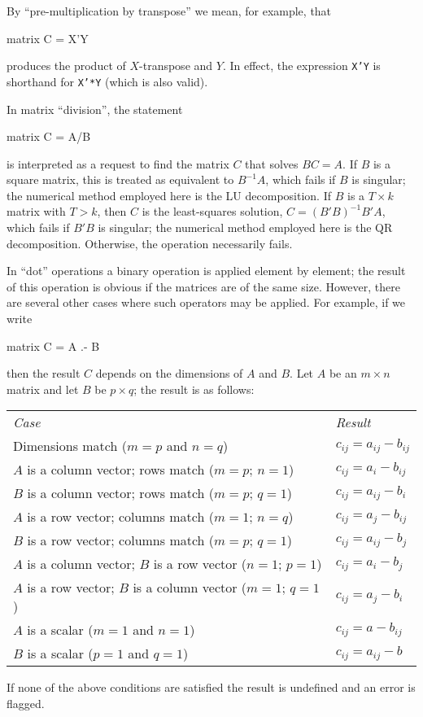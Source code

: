 By ``pre-multiplication by transpose'' we mean, for example, that 
%
\begin{code}
matrix C = X'Y
\end{code}
%
produces the product of $X$-transpose and $Y$.  In effect, 
the expression \texttt{X'Y} is shorthand for \texttt{X'*Y}
(which is also valid).

In matrix ``division'', the statement 
%
\begin{code}
matrix C = A/B
\end{code}
%
is interpreted as a request to find the matrix $C$ that solves $BC=A$.
If $B$ is a square matrix, this is treated as equivalent to $B^{-1}A$,
which fails if $B$ is singular; the numerical method employed here is
the LU decomposition.  If $B$ is a $T \times k$ matrix with
$T > k$, then $C$ is the least-squares solution, $C = (B'B)^{-1}B'A$,
which fails if $B'B$ is singular; the numerical method employed here is
the QR decomposition.  Otherwise, the operation necessarily fails.

In ``dot'' operations a binary operation is applied element by
element; the result of this operation is obvious if the matrices are
of the same size. However, there are several other cases where such
operators may be applied.  For example, if we write
%
\begin{code}
matrix C = A .- B
\end{code}
% 
then the result $C$ depends on the dimensions of $A$ and $B$.  Let $A$
be an $m \times n$ matrix and let $B$ be $p \times q$; the result is
as follows:
\begin{center}
  \begin{tabular}{ll}
    \textit{Case} & \textit{Result} \\[4pt]
    Dimensions match ($m=p$ and $n=q$) & 
    $c_{ij} = a_{ij} -  b_{ij}$ \\ 
    $A$ is a column vector; rows match ($m=p$; $n=1$) &
    $c_{ij} = a_{i} - b_{ij}$ \\ 
    $B$ is a column vector; rows match ($m=p$; $q=1$) &
    $c_{ij} = a_{ij} - b_{i}$ \\ 
    $A$ is a row vector; columns match ($m=1$; $n=q$) &
    $c_{ij} = a_{j} - b_{ij}$ \\ 
    $B$ is a row vector; columns match ($m=p$; $q=1$) &
    $c_{ij} = a_{ij} - b_{j}$ \\ 
    $A$ is a column vector; $B$ is a row vector ($n=1$; $p=1$) &
    $c_{ij} = a_{i} - b_{j}$ \\ 
    $A$ is a row vector; $B$ is a column vector ($m=1$; $q=1$) &
    $c_{ij} = a_{j} - b_{i}$ \\ 
    $A$ is a scalar ($m=1$ and $n=1$) &
    $c_{ij} = a - b_{ij}$ \\ 
    $B$ is a scalar ($p=1$ and $q=1$) &
    $c_{ij} = a_{ij} - b$ \\ 
  \end{tabular}
\end{center}
%
If none of the above conditions are satisfied the result is undefined
and an error is flagged.

